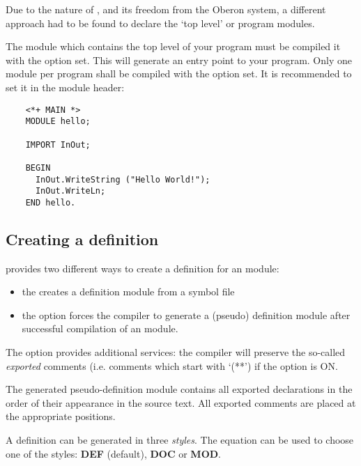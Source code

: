 Due to the nature of \xds{}, and its freedom from the Oberon
system, a different approach had to be found to declare
the `top level' or program modules.

The module which contains the top level of your program must
be compiled it with the  option set.
This will generate an entry point to your program.
Only one module per program shall be compiled
with the option set. It is recommended to set it in the module
header:

\begin{verbatim}
    <*+ MAIN *>
    MODULE hello;

    IMPORT InOut;

    BEGIN
      InOut.WriteString ("Hello World!");
      InOut.WriteLn;
    END hello.
\end{verbatim}

\subsection{Creating a definition}\label{o2:env:makedef}

\xds{} provides two different ways to create a definition
for an \ot{} module:
\begin{itemize}
\item
        the 
        creates a definition module from a symbol file
\item
        the  option forces the \ot{}
        compiler to generate a (pseudo) definition module
        after successful compilation of an \ot{} module.
\end{itemize}

The  option provides additional services:
the compiler will preserve the so-called {\em exported}
comments (i.e. comments which start with `(**')
if the  option is ON.

The generated pseudo-definition module contains all exported declarations
in the order of their appearance in the source text.
All exported comments are placed at the appropriate positions.

A definition can be generated in three
{\em styles}.
The  equation can be used to choose one of the styles:
{\bf DEF} (default), {\bf DOC} or {\bf MOD}.

